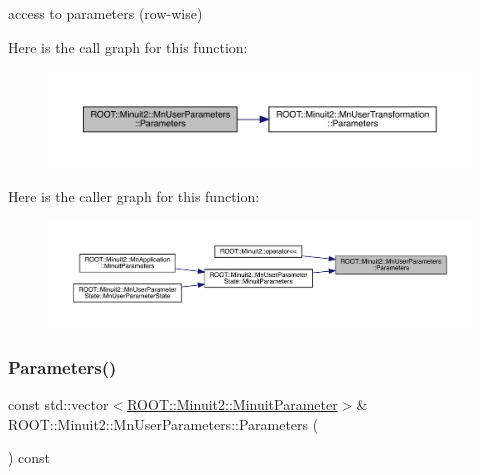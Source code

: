 access to parameters (row-\/wise) 

Here is the call graph for this function\+:
\nopagebreak
\begin{figure}[H]
\begin{center}
\leavevmode
\includegraphics[width=350pt]{d6/d10/classROOT_1_1Minuit2_1_1MnUserParameters_a6b6a4cf33fb9e482a193db522763cd76_cgraph}
\end{center}
\end{figure}
Here is the caller graph for this function\+:
\nopagebreak
\begin{figure}[H]
\begin{center}
\leavevmode
\includegraphics[width=350pt]{d6/d10/classROOT_1_1Minuit2_1_1MnUserParameters_a6b6a4cf33fb9e482a193db522763cd76_icgraph}
\end{center}
\end{figure}
\mbox{\label{classROOT_1_1Minuit2_1_1MnUserParameters_a0ca783762d29fc6e9fa2c7b162f044f4}} 
\subsubsection{\texorpdfstring{Parameters()}{Parameters()}\hspace{0.1cm}{\footnotesize\ttfamily [2/3]}}
{\footnotesize\ttfamily const std\+::vector$<$\mbox{\hyperlink{classROOT_1_1Minuit2_1_1MinuitParameter}{R\+O\+O\+T\+::\+Minuit2\+::\+Minuit\+Parameter}}$>$\& R\+O\+O\+T\+::\+Minuit2\+::\+Mn\+User\+Parameters\+::\+Parameters (\begin{DoxyParamCaption}{ }\end{DoxyParamCaption}) const}



